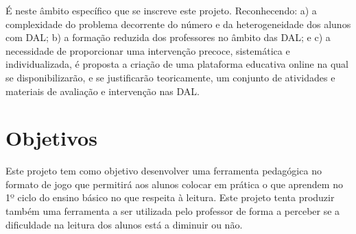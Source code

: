 \documentclass{article}
\begin{document}
É neste âmbito específico que se inscreve este projeto. Reconhecendo: a) a complexidade do problema decorrente do número e da heterogeneidade dos alunos com DAL; b) a formação reduzida dos professores no âmbito das DAL; e c) a necessidade de proporcionar uma intervenção precoce, sistemática e individualizada, é proposta a criação de uma plataforma educativa online na qual se disponibilizarão, e se justificarão teoricamente, um conjunto de atividades e materiais de avaliação e intervenção nas DAL.



\section{Objetivos}
Este projeto tem como objetivo desenvolver uma ferramenta pedagógica no formato de jogo que permitirá aos alunos colocar em prática o que aprendem no 1º ciclo do ensino básico no que respeita à leitura. Este projeto tenta produzir também uma ferramenta a ser utilizada pelo professor de forma a perceber se a dificuldade na leitura dos alunos está a diminuir ou não.

\newpage
\end{document}
